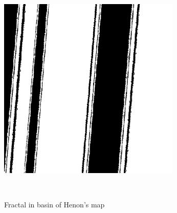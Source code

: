 \documentclass[12pt]{article}
\theoremstyle{plain}
\begin{document}
\begin{figure}[H]
\begin{minipage}[c][0.33\width]{
   0.33\textwidth}
   \includegraphics[width=.7\textwidth]{figure/section4/Henon-basin-02.png}
\end{minipage}
\\[5ex]\caption{Fractal in basin of Henon's map}\label{Fractal-henon-basin}
\end{figure}
\end{document}
